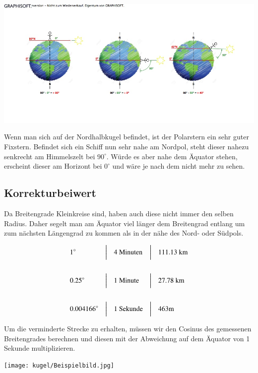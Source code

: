 \begin{refsection}
\begin{refsection}
\begin{center}
        \includegraphics[width=1\textwidth]{kugel/1Breitengrad.jpg}
\end{center}

Wenn man sich auf der Nordhalbkugel befindet, ist der Polarstern ein sehr guter Fixstern. Befindet sich ein Schiff nun sehr nahe am Nordpol, steht dieser nahezu senkrecht am Himmelszelt bei $90^{\circ}$. Würde es aber nahe dem Äquator stehen, erscheint dieser am Horizont bei $0^{\circ}$ und wäre je nach dem nicht mehr zu sehen.


\subsection{Korrekturbeiwert}
Da Breitengrade Kleinkreise sind, haben auch diese nicht immer den selben Radius. Daher segelt man am Äquator viel länger dem Breitengrad entlang um zum nächsten Längengrad zu kommen als in der nähe des Nord- oder Südpols.

\[
\begin{aligned}
&\text{1}^{\circ}
&
&\text{\bigg \vert}
&
&\text{4 Minuten}
&
&\text{\bigg \vert}
&
&\text{111.13 km}
\\
\\
&\text{0.25}^{\circ}
&
&\text{\bigg \vert}
&
&\text{1 Minute}
&
&\text{\bigg \vert}
&
&\text{27.78 km}
\\
\\
&\text{0.004166}^{\circ}
&
&\text{\bigg \vert}
&
&\text{1 Sekunde}
&
&\text{\bigg \vert}
&
&\text{463m}
\end{aligned}
\]

Um die verminderte Strecke zu erhalten, müssen wir den Cosinus des gemessenen Breitengrades berechnen und diesen mit der Abweichung auf dem Äquator von 1 Sekunde multiplizieren.

\begin{center}
        \texttt{[image: kugel/Beispielbild.jpg]}
\end{center}


\end{refsection}
\end{refsection}
